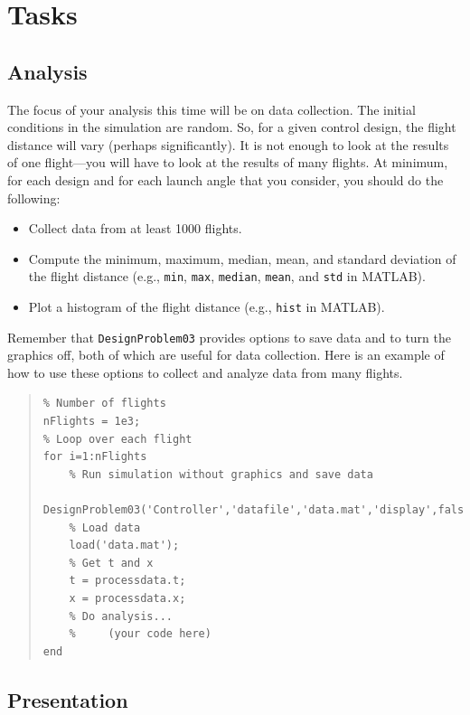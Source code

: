 \documentclass[conf]{new-aiaa}
\begin{document}
\section{Tasks}


\subsection{Analysis}
\label{secAnalysis}

The focus of your analysis this time will be on data collection. The initial conditions in the simulation are random. So, for a given control design, the flight distance will vary (perhaps significantly). It is not enough to look at the results of one flight---you will have to look at the results of many flights. At minimum, for each design and for each launch angle that you consider, you should do the following:
\begin{itemize}
\item Collect data from at least 1000 flights.
\item Compute the minimum, maximum, median, mean, and standard deviation of the flight distance (e.g., \lstinline|min|, \lstinline|max|, \lstinline|median|, \lstinline|mean|, and \lstinline|std| in MATLAB).
\item Plot a histogram of the flight distance (e.g., \lstinline|hist| in MATLAB).
\end{itemize}
Remember that \lstinline|DesignProblem03| provides options to save data and to turn the graphics off, both of which are useful for data collection. Here is an example of how to use these options to collect and analyze data from many flights.
\begin{quote}
\begin{lstlisting}
% Number of flights
nFlights = 1e3;
% Loop over each flight
for i=1:nFlights
    % Run simulation without graphics and save data
    DesignProblem03('Controller','datafile','data.mat','display',false);
    % Load data
    load('data.mat');
    % Get t and x
    t = processdata.t;
    x = processdata.x;
    % Do analysis...
    %     (your code here)
end
\end{lstlisting}
\end{quote}


\subsection{Presentation}
\end{document}
